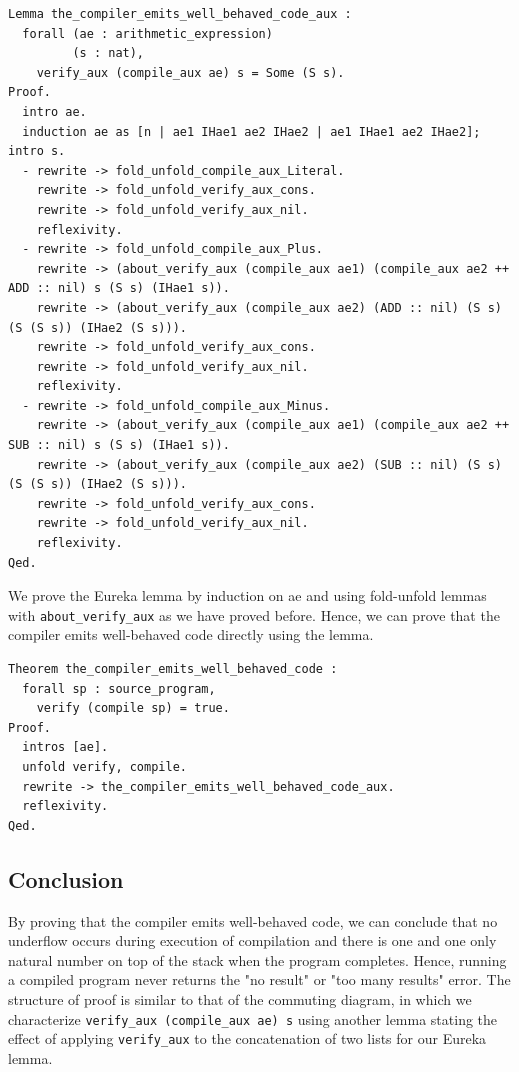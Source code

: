 \documentclass{article}
\begin{document}
\begin{lstlisting}
Lemma the_compiler_emits_well_behaved_code_aux :
  forall (ae : arithmetic_expression)
         (s : nat),
    verify_aux (compile_aux ae) s = Some (S s).
Proof.
  intro ae.
  induction ae as [n | ae1 IHae1 ae2 IHae2 | ae1 IHae1 ae2 IHae2]; intro s.
  - rewrite -> fold_unfold_compile_aux_Literal.
    rewrite -> fold_unfold_verify_aux_cons.
    rewrite -> fold_unfold_verify_aux_nil.
    reflexivity.
  - rewrite -> fold_unfold_compile_aux_Plus.
    rewrite -> (about_verify_aux (compile_aux ae1) (compile_aux ae2 ++ ADD :: nil) s (S s) (IHae1 s)).
    rewrite -> (about_verify_aux (compile_aux ae2) (ADD :: nil) (S s) (S (S s)) (IHae2 (S s))).
    rewrite -> fold_unfold_verify_aux_cons.
    rewrite -> fold_unfold_verify_aux_nil.
    reflexivity.
  - rewrite -> fold_unfold_compile_aux_Minus.
    rewrite -> (about_verify_aux (compile_aux ae1) (compile_aux ae2 ++ SUB :: nil) s (S s) (IHae1 s)).
    rewrite -> (about_verify_aux (compile_aux ae2) (SUB :: nil) (S s) (S (S s)) (IHae2 (S s))).
    rewrite -> fold_unfold_verify_aux_cons.
    rewrite -> fold_unfold_verify_aux_nil.
    reflexivity.
Qed.
\end{lstlisting}

We prove the Eureka lemma by induction on ae and using fold-unfold lemmas with \texttt{about\_verify\_aux} as we have proved before. Hence, we can prove that the compiler emits well-behaved code directly using the lemma.
\begin{lstlisting}
Theorem the_compiler_emits_well_behaved_code :
  forall sp : source_program,
    verify (compile sp) = true.
Proof.
  intros [ae].
  unfold verify, compile.
  rewrite -> the_compiler_emits_well_behaved_code_aux.
  reflexivity.
Qed.
\end{lstlisting}

\subsection{Conclusion}
By proving that the compiler emits well-behaved code, we can conclude that no underflow occurs during execution of compilation and there is one and one only natural number on top of the stack when the program completes. Hence, running a compiled program never returns the "no result" or "too many results" error. The structure of proof is similar to that of the commuting diagram, in which we characterize \texttt{verify\_aux (compile\_aux ae) s} using another lemma stating the effect of applying \texttt{verify\_aux} to the concatenation of two lists for our Eureka lemma. 
\end{document}
